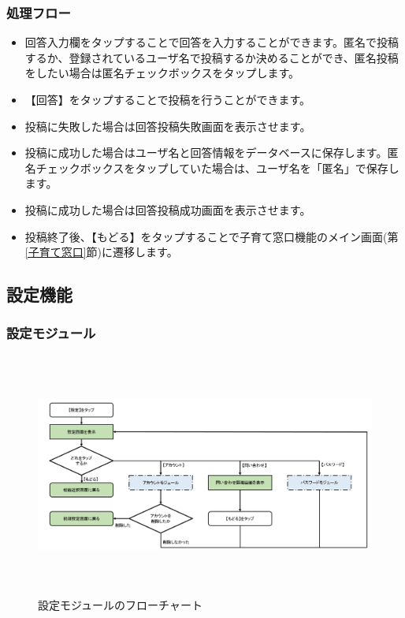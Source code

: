 \documentclass[a4j]{jarticle}
\begin{document}
\subsubsection*{処理フロー}
\begin{itemize}
\item 回答入力欄をタップすることで回答を入力することができます。匿名で投稿するか、登録されているユーザ名で投稿するか決めることができ、匿名投稿をしたい場合は匿名チェックボックスをタップします。
\item 【回答】をタップすることで投稿を行うことができます。
\item 投稿に失敗した場合は回答投稿失敗画面を表示させます。
\item 投稿に成功した場合はユーザ名と回答情報をデータベースに保存します。匿名チェックボックスをタップしていた場合は、ユーザ名を「匿名」で保存します。
\item 投稿に成功した場合は回答投稿成功画面を表示させます。
\item 投稿終了後、【もどる】をタップすることで子育て窓口機能のメイン画面(第\ref{子育て窓口}節)に遷移します。

\end{itemize}

\newpage

\subsection{設定機能}
\subsubsection{設定モジュール\label{設定}} %
\begin{figure}[H]
    \begin{center}
      \includegraphics[height=8.0cm] {設定_全体.png} %
    \caption {設定モジュールのフローチャート}
    \label{設定_全体}
    \end{center}
\end{figure}
\end{document}
